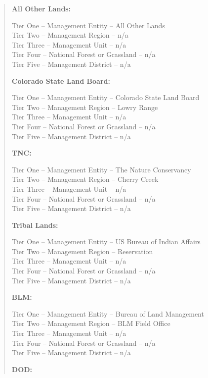 \documentclass[
  letterpaper,
  DIV=11,
  numbers=noendperiod,
  oneside]{scrreprt}
\begin{document}
\begin{quote}
\textbf{All Other Lands:}

Tier One -- Management Entity -- All Other Lands\\
Tier Two -- Management Region -- n/a\\
Tier Three -- Management Unit -- n/a\\
Tier Four -- National Forest or Grassland -- n/a\\
Tier Five -- Management District -- n/a

\textbf{Colorado State Land Board:}

Tier One -- Management Entity -- Colorado State Land Board\\
Tier Two -- Management Region -- Lowry Range\\
Tier Three -- Management Unit -- n/a\\
Tier Four -- National Forest or Grassland -- n/a\\
Tier Five -- Management District -- n/a

\textbf{TNC:}

Tier One -- Management Entity -- The Nature Conservancy\\
Tier Two -- Management Region -- Cherry Creek\\
Tier Three -- Management Unit -- n/a\\
Tier Four -- National Forest or Grassland -- n/a\\
Tier Five -- Management District -- n/a

\textbf{Tribal Lands:}

Tier One -- Management Entity -- US Bureau of Indian Affairs\\
Tier Two -- Management Region -- Reservation\\
Tier Three -- Management Unit -- n/a\\
Tier Four -- National Forest or Grassland -- n/a\\
Tier Five -- Management District -- n/a

\textbf{BLM:}

Tier One -- Management Entity -- Bureau of Land Management\\
Tier Two -- Management Region -- BLM Field Office\\
Tier Three -- Management Unit -- n/a\\
Tier Four -- National Forest or Grassland -- n/a\\
Tier Five -- Management District -- n/a

\textbf{DOD:}


\end{quote}
\end{document}
